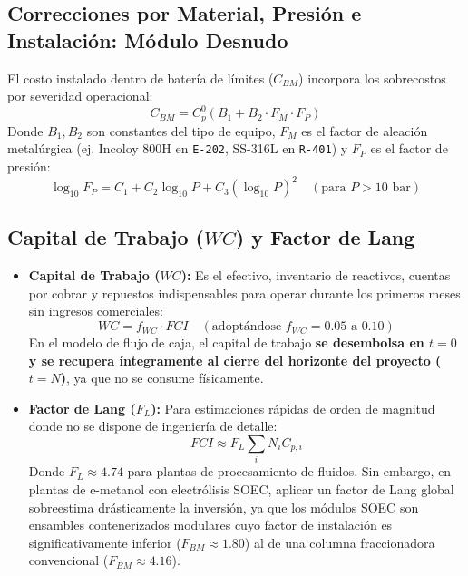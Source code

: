 \documentclass[11pt,letterpaper]{article}
\begin{document}
\subsection{Correcciones por Material, Presión e Instalación: Módulo Desnudo}
El costo instalado dentro de batería de límites ($C_{BM}$) incorpora los sobrecostos por severidad operacional:
\begin{equation}
    C_{BM} = C_p^0 (B_1 + B_2 \cdot F_M \cdot F_P)
\end{equation}
Donde $B_1, B_2$ son constantes del tipo de equipo, $F_M$ es el factor de aleación metalúrgica (ej. Incoloy 800H en \texttt{E-202}, SS-316L en \texttt{R-401}) y $F_P$ es el factor de presión:
\begin{equation}
    \log_{10} F_P = C_1 + C_2 \log_{10} P + C_3 (\log_{10} P)^2 \quad (\text{para } P > 10\text{ bar})
\end{equation}

\subsection{Capital de Trabajo ($WC$) y Factor de Lang}
\begin{itemize}[leftmargin=*]
    \item \textbf{Capital de Trabajo ($WC$):} Es el efectivo, inventario de reactivos, cuentas por cobrar y repuestos indispensables para operar durante los primeros meses sin ingresos comerciales:
    \begin{equation}
        WC = f_{WC} \cdot FCI \quad (\text{adoptándose } f_{WC} = 0.05\text{ a } 0.10)
    \end{equation}
    En el modelo de flujo de caja, el capital de trabajo \textbf{se desembolsa en $t = 0$ y se recupera íntegramente al cierre del horizonte del proyecto ($t = N$)}, ya que no se consume físicamente.
    \item \textbf{Factor de Lang ($F_L$):} Para estimaciones rápidas de orden de magnitud donde no se dispone de ingeniería de detalle:
    \begin{equation}
        FCI \approx F_L \sum_i N_i C_{p,i}
    \end{equation}
    Donde $F_L \approx 4.74$ para plantas de procesamiento de fluidos. Sin embargo, en plantas de e-metanol con electrólisis SOEC, aplicar un factor de Lang global sobreestima drásticamente la inversión, ya que los módulos SOEC son ensambles contenerizados modulares cuyo factor de instalación es significativamente inferior ($F_{BM} \approx 1.80$) al de una columna fraccionadora convencional ($F_{BM} \approx 4.16$).
\end{itemize}
\end{document}
